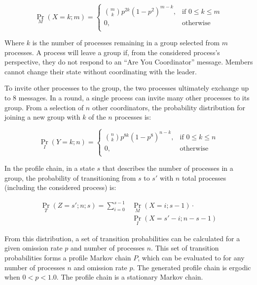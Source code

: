 \begin{equation}
 \Pr_{M}(X=k; m) =
   \begin{cases}
    \binom{m}{k} p^{2k}(1-p^2)^{m-k}, & \text{if } 0 \leq k \leq m \\
    0,                                & \text{otherwise} \\
  \end{cases}
\end{equation}

Where $k$ is the number of processes remaining in a group selected from $m$ processes.
A process will leave a group if, from the considered process's perspective, they do not respond to an ``Are You Coordinator'' message.
Members cannot change their state without coordinating with the leader.

To invite other processes to the group, the two processes ultimately exchange up to 8 messages.
In a round, a single process can invite many other processes to its group.
From a selection of $n$ other coordinators, the probability distribution for joining a new group with $k$ of the $n$ processes is:

\begin{equation}
	\Pr_{I}(Y=k; n) =
	\begin{cases}
		\binom{n}{k} p^{8k}(1-p^8)^{n-k}, & \text{if } 0 \leq k \leq n \\
		0,                                & \text{otherwise} \\
	\end{cases}
\end{equation}

In the profile chain, in a state $s$ that describes the number of processes in a group, the probability of transitioning from $s$ to $s'$ with $n$ total processes (including the considered process) is:

\begin{align} \Pr_{T}(Z=s'; n; s) = \sum_{i=0}^{s-1} &\Pr_{M}(X=i; s-1) \cdot
\nonumber \\ &\Pr_{I}(X=s'-i; n-s-1) \end{align}

From this distribution, a set of transition probabilities can be calculated for a given omission rate $p$ and number of processes $n$.
This set of transition probabilities forms a profile Markov chain $P$, which can be evaluated to for any number of processes $n$ and omission rate $p$.
The generated profile chain is ergodic when $0<p<1.0$. The profile chain is a stationary Markov chain.

